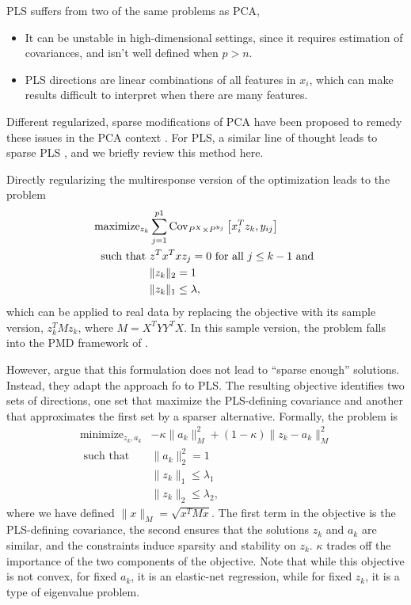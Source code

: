 \documentclass{article}
\begin{document}
PLS suffers from two of the same problems as PCA,
\begin{itemize}
\item It can be unstable in high-dimensional settings, since it requires
  estimation of covariances, and isn't well defined when $p > n$.
\item PLS directions are linear combinations of all features in $x_i$, which can
  make results difficult to interpret when there are many features.
\end{itemize}

Different regularized, sparse modifications of PCA have been proposed to remedy
these issues in the PCA context \citep{zou2006sparse, witten2009penalized}. For
PLS, a similar line of thought leads to sparse PLS \citep{chun2010sparse}, and
we briefly review this method here.

Directly regularizing the multiresponse version of the
optimization \label{eq:pls_obj} leads to the problem
\begin{align*}
  \text{maximize}_{z_k} &\sum_{j = 1}^{p1} \mathrm{Cov}_{P^X \times P^{y_j}}\left[{x_i^T z_k, y_{ij}}\right] \\
  \text{such that }&z^{T}x^{T}x z_{j} = 0 \text{ for all }j
  \leq k - 1 \text{ and } \\
  &\|z_k\|_2 = 1 \\
  &\|z_k\|_1 \leq \lambda,
\end{align*}
which can be applied to real data by replacing the objective with its sample
version, $z_k^{T} M z_k$, where $M = X^{T}YY^{T}X$. In this sample version, the
problem falls into the PMD framework of \citep{witten2009penalized}.

However, \cite{chun2010sparse} argue that this formulation does not lead to
``sparse enough'' solutions. Instead, they adapt the approach fo
\cite{zou2006sparse} to PLS. The resulting objective identifies two sets of
directions, one set that maximize the PLS-defining covariance and another that
approximates the first set by a sparser alternative. Formally, the problem is
\begin{align}
  \label{eq:spls_obj}
  \text{minimize}_{z_k, a_k} &-\kappa \|a_k\|_M^2 + \left(1 - \kappa\right) \|z_k - a_k\|_M^2 \\
  \text{ such that } & \|a_k\|_2^2 = 1 \\
  &\|z_k\|_1 \leq \lambda_1 \\
  &\|z_k\|_2 \leq \lambda_2,
\end{align}
where we have defined $\|x\|_M = \sqrt{x^T M x}$. The first term in the
objective is the PLS-defining covariance, the second ensures that the solutions
$z_k$ and $a_k$ are similar, and the constraints induce sparsity and stability
on $z_k$. $\kappa$ trades off the importance of the two components of the
objective. Note that while this objective is not convex, for fixed $a_k$, it is
an elastic-net regression, while for fixed $z_k$, it is a type of eigenvalue
problem.
\end{document}
